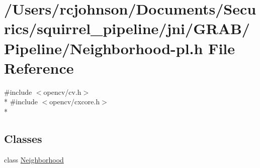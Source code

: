 \hypertarget{_neighborhood-pl_8h}{\section{/\-Users/rcjohnson/\-Documents/\-Securics/squirrel\-\_\-pipeline/jni/\-G\-R\-A\-B/\-Pipeline/\-Neighborhood-\/pl.h File Reference}
\label{_neighborhood-pl_8h}
}
{\ttfamily \#include $<$opencv/cv.\-h$>$}\\*
{\ttfamily \#include $<$opencv/cxcore.\-h$>$}\\*
\subsection*{Classes}
\begin{DoxyCompactItemize}
\item 
class \hyperlink{class_neighborhood}{Neighborhood}
\end{DoxyCompactItemize}
